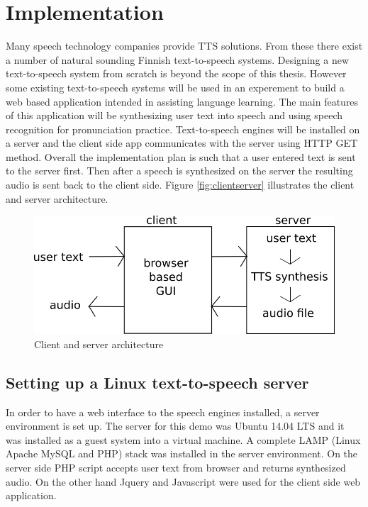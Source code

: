\documentclass[11pt,a4paper,oneside,article]{memoir}
\begin{document}
\clearpage
\chapter{Implementation}

Many speech technology companies provide TTS solutions. From these there exist a number of natural sounding Finnish text-to-speech systems. Designing a new text-to-speech system from scratch is beyond the scope of this thesis. However some existing text-to-speech systems will be used in an experement to build a web based application  intended in assisting language learning. The main features of this application will be synthesizing user text into speech and using speech recognition for pronunciation practice. Text-to-speech engines will be installed on a server and the client side app communicates with the server using HTTP GET method. Overall the implementation plan is such that a user entered text is sent to the server first. Then after a speech is synthesized on the server the resulting audio is sent back to the client side.  Figure \vref{fig:clientserver} illustrates the client and server architecture.

\begin{figure}[h]
  \includegraphics[width=12cm]{clientserver}
  \caption{Client and server architecture}
  \label{fig:clientserver}
\end{figure}


\section{Setting up a Linux text-to-speech server }
In order to have a web interface to the speech engines installed, a server environment is set up. The server for this demo was Ubuntu 14.04 LTS and it was installed as a guest system into a virtual machine. A complete LAMP (Linux Apache MySQL and PHP) stack was installed in the server environment. On the server side PHP script accepts user text from browser and returns synthesized audio. On the other hand Jquery and Javascript were used for the client side web application. 
\end{document}
